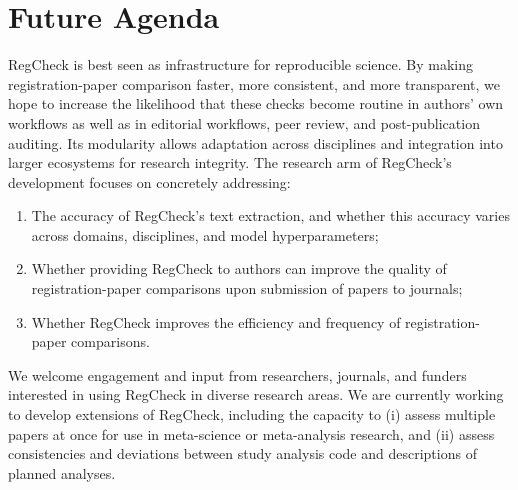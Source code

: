 \documentclass{article}
\begin{document}
\section{Future Agenda}
RegCheck is best seen as infrastructure for reproducible science. By making registration-paper comparison faster, more consistent, and more transparent, we hope to increase the likelihood that these checks become routine in authors' own workflows as well as in editorial workflows, peer review, and post-publication auditing. Its modularity allows adaptation across disciplines and integration into larger ecosystems for research integrity.
The research arm of RegCheck's development focuses on concretely addressing:
\begin{enumerate}
\item The accuracy of RegCheck's text extraction, and whether this accuracy varies across domains, disciplines, and model hyperparameters;
\item Whether providing RegCheck to authors can improve the quality of registration-paper comparisons upon submission of papers to journals;
\item Whether RegCheck improves the efficiency and frequency of registration-paper comparisons.
\end{enumerate}
We welcome engagement and input from researchers, journals, and funders interested in using RegCheck in diverse research areas. We are currently working to develop extensions of RegCheck, including the capacity to (i) assess multiple papers at once for use in meta-science or meta-analysis research, and (ii) assess consistencies and deviations between study analysis code and descriptions of planned analyses.



\end{document}
